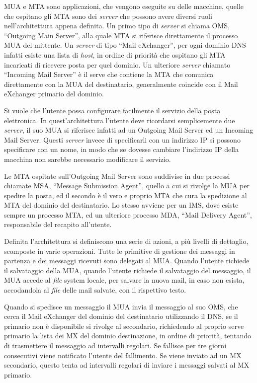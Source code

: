 \documentclass{article}
\numberwithin{equation}{subsection}
\begin{document}
MUA e MTA sono applicazioni, che vengono eseguite su delle macchine, quelle che ospitano gli MTA sono dei \textit{server} che possono avere diversi ruoli nell'architettura appena definita. Un primo tipo di \textit{server} si chiama OMS, ``Outgoing Main Server'', alla quale MTA si riferisce direttamente il processo MUA del mittente. 
Un \textit{server} di tipo ``Mail eXchanger'', per ogni dominio \textcolor{Mahogany}{DNS} infatti esiste una lista di \textit{host}, in ordine di priorità che ospitano gli MTA incaricati di ricevere posta per quel dominio. 
Un ulteriore \textit{server} chiamato ``Incoming Mail Server'' è il serve che contiene la MTA che comunica direttamente con la MUA del destinatario, generalmente coincide con il Mail eXchanger primario del dominio. 

Si vuole che l'utente possa configurare facilmente il servizio della posta elettronica. In quest'architettura l'utente deve ricordarsi semplicemente due \textit{server}, il suo MUA si riferisce infatti ad un Outgoing Mail Server ed un Incoming Mail Server. Questi \textit{server} invece di specificarli con un indirizzo \textcolor{Bittersweet}{IP} si possono specificare con un nome, in modo che se dovesse cambiare l'indirizzo \textcolor{Bittersweet}{IP} della macchina non sarebbe necessario modificare il servizio. 

Le MTA ospitate sull'Outgoing Mail Server sono suddivise in due processi chiamate MSA, ``Message Submission Agent'', quello a cui si rivolge la MUA per spedire la posta, ed il secondo è il vero e proprio MTA che cura la spedizione al MTA del dominio del destinatario. Lo stesso avviene per un IMS, dove esiste sempre un processo MTA, ed un ulteriore processo MDA, ``Mail Delivery Agent'', responsabile del recapito all'utente. 


Definita l'architettura si definiscono una serie di azioni, a più livelli di dettaglio, scomposte in varie operazioni. Tutte le primitive di gestione dei messaggi in partenza e dei messaggi ricevuti 
sono delegati al MUA. Quando l'utente richiede il salvataggio della MUA, quando l'utente richiede il salvataggio del messaggio, il MUA accede al \textit{file} system locale, per salvare la nuova mail, in caso non esista, accodandola al \textit{file} delle mail salvate, con il rispettivo testo. 

Quando si spedisce un messaggio il MUA invia il messaggio al suo OMS, che cerca il Mail eXchanger del dominio del destinatario utilizzando il \textcolor{Mahogany}{DNS}, se il primario non è disponibile si rivolge al secondario, richiedendo al proprio serve primario la lista dei MX del dominio destinazione, in ordine di priorità, tentando di trasmettere il messaggio ad intervalli regolari. Se fallisce per tre giorni consecutivi viene notificato l'utente del fallimento. Se viene inviato ad un MX secondario, questo tenta ad intervalli regolari di inviare i messaggi salvati al MX primario. 
\end{document}
